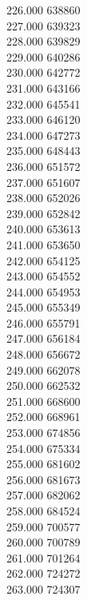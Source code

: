 { 226.000	638860 \\
 227.000	639323 \\
 228.000	639829 \\
 229.000	640286 \\
 230.000	642772 \\
 231.000	643166 \\
 232.000	645541 \\
 233.000	646120 \\
 234.000	647273 \\
 235.000	648443 \\
 236.000	651572 \\
 237.000	651607 \\
 238.000	652026 \\
 239.000	652842 \\
 240.000	653613 \\
 241.000	653650 \\
 242.000	654125 \\
 243.000	654552 \\
 244.000	654953 \\
 245.000	655349 \\
 246.000	655791 \\
 247.000	656184 \\
 248.000	656672 \\
 249.000	662078 \\
 250.000	662532 \\
 251.000	668600 \\
 252.000	668961 \\
 253.000	674856 \\
 254.000	675334 \\
 255.000	681602 \\
 256.000	681673 \\
 257.000	682062 \\
 258.000	684524 \\
 259.000	700577 \\
 260.000	700789 \\
 261.000	701264 \\
 262.000	724272 \\
 263.000	724307 \\
}
